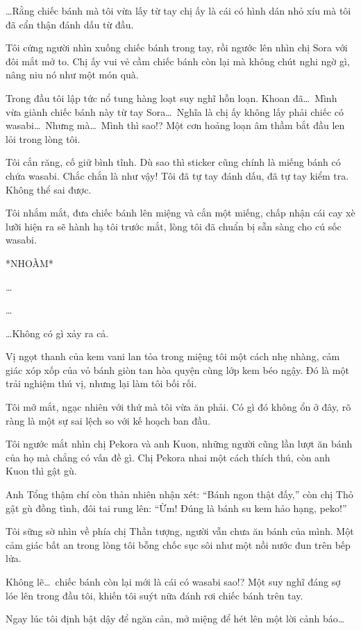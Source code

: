 \documentclass[../main.tex]{subfiles}
\begin{document}
\dots Rằng chiếc bánh mà tôi vừa lấy từ tay chị ấy là cái có hình dán nhỏ xíu mà tôi đã cẩn thận đánh dấu từ đầu.

Tôi cứng người nhìn xuống chiếc bánh trong tay, rồi ngước lên nhìn chị Sora với đôi mắt mở to. Chị ấy vui vẻ cầm chiếc bánh còn lại mà không chút nghi ngờ gì, nâng niu nó như một món quà.

Trong đầu tôi lập tức nổ tung hàng loạt suy nghĩ hỗn loạn. Khoan đã\dots\ Mình vừa giành chiếc bánh này từ tay Sora\dots\ Nghĩa là chị ấy không lấy phải chiếc có wasabi\dots\ Nhưng mà\dots\ Mình thì sao!? Một cơn hoảng loạn âm thầm bắt đầu len lỏi trong lòng tôi.

Tôi cắn răng, cố giữ bình tĩnh. Dù sao thì sticker cũng chính là miếng bánh có chứa wasabi. Chắc chắn là như vậy! Tôi đã tự tay đánh dấu, đã tự tay kiểm tra. Không thể sai được.

Tôi nhắm mắt, đưa chiếc bánh lên miệng và cắn một miếng, chấp nhận cái cay xè lưỡi hiện ra sẽ hành hạ tôi trước mắt, lòng tôi đã chuẩn bị sẵn sàng cho cú sốc wasabi.

*NHOÀM*

\dots

\dots

\dots Không có gì xảy ra cả.

Vị ngọt thanh của kem vani lan tỏa trong miệng tôi một cách nhẹ nhàng, cảm giác xóp xốp của vỏ bánh giòn tan hòa quyện cùng lớp kem béo ngậy. Đó là một trải nghiệm thú vị, nhưng lại làm tôi bối rối.

Tôi mở mắt, ngạc nhiên với thứ mà tôi vừa ăn phải. Có gì đó không ổn ở đây, rõ ràng là một sự sai lệch so với kế hoạch ban đầu.

Tôi ngước mắt nhìn chị Pekora và anh Kuon, những người cũng lần lượt ăn bánh của họ mà chẳng có vấn đề gì. Chị Pekora nhai một cách thích thú, còn anh Kuon thì gật gù.

Anh Tổng thậm chí còn thản nhiên nhận xét: ``Bánh ngon thật đấy,'' còn chị Thỏ gật gù đồng tình, đôi tai rung lên: ``Ừm! Đúng là bánh su kem hảo hạng, peko!''

Tôi sững sờ nhìn về phía chị Thần tượng, người vẫn chưa ăn bánh của mình. Một cảm giác bất an trong lòng tôi bỗng chốc sục sôi như một nồi nước đun trên bếp lửa.

Không lẽ\dots\ chiếc bánh còn lại mới là cái có wasabi sao!? Một suy nghĩ đáng sợ lóe lên trong đầu tôi, khiến tôi suýt nữa đánh rơi chiếc bánh trên tay.

Ngay lúc tôi định bật dậy để ngăn cản, mở miệng để hét lên một lời cảnh báo\dots
\end{document}

